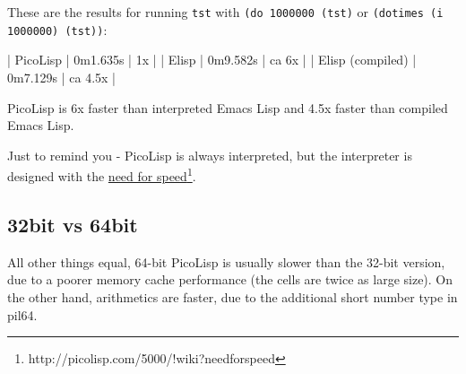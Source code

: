 These are the results for running \texttt{tst} with \texttt{(do 1000000 (tst)} or
\texttt{(dotimes (i 1000000) (tst))}:

\begin{wideverbatim}
| PicoLisp         | 0m1.635s | 1x      |
| Elisp            | 0m9.582s | ca 6x   |
| Elisp (compiled) | 0m7.129s | ca 4.5x |
\end{wideverbatim}


PicoLisp is 6x faster than interpreted Emacs Lisp and 4.5x faster than
compiled Emacs Lisp.

Just to remind you - PicoLisp is always interpreted, but the
interpreter is designed with the \underline{need for speed}\footnote{http://picolisp.com/5000/!wiki?needforspeed}.


\subsection{32bit vs 64bit}
\label{sec:pl-vs-elisp-32bit-vs-64bit}
All other things equal, 64-bit PicoLisp is usually slower than the 32-bit
version, due to a poorer memory cache performance (the cells are twice as
large size). On the other hand, arithmetics are faster, due to the additional
short number type in pil64.
